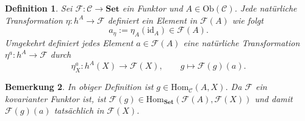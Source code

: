 \documentclass[a4paper, 11pt]{scrartcl}
\newcommand{\Hom}{\text{Hom}}
\newcommand{\id}{\text{id}}
\newcommand{\Ob}{\text{Ob}}
\theoremstyle{basicstyle}
\newtheorem{definition}{Definition}[section]
\newtheorem{bemerkung}[definition]{Bemerkung}
\begin{document}
    \begin{definition}
        Sei \(\mathcal{F}: \mathcal{C} \to \textbf{Set}\) ein Funktor und \(A \in \Ob(\mathcal{C})\).
        Jede natürliche Transformation \(\eta: h^A \to \mathcal{F}\) definiert ein Element in \(\mathcal{F}(A)\) wie folgt
        \[a_{\eta} := \eta_A(\id_A) \in \mathcal{F}(A).\]
        Umgekehrt definiert jedes Element \(a \in \mathcal{F}(A)\) eine natürliche Transformation \(\eta^a: h^A \to \mathcal{F}\) durch
        \[\eta_X^a: h^A(X) \longrightarrow \mathcal{F}(X), \qquad g \mapsto \mathcal{F}(g)(a).\]
    \end{definition}

    \begin{bemerkung}
        In obiger Definition ist \(g \in \Hom_{\mathcal{C}}(A, X)\).
        Da \(\mathcal{F}\) ein kovarianter Funktor ist, ist \(\mathcal{F}(g) \in \Hom_{\textbf{Set}}(\mathcal{F}(A), \mathcal{F}(X))\) und damit \(\mathcal{F}(g)(a)\) tatsächlich in \(\mathcal{F}(X)\).
    \end{bemerkung}
\end{document}
